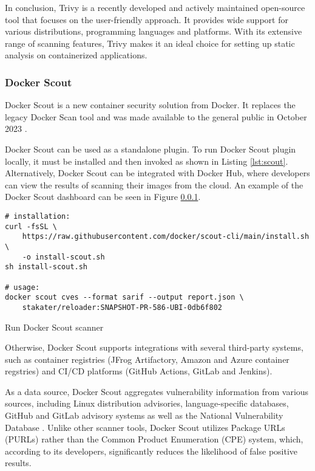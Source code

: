 In conclusion, Trivy is a recently developed and actively maintained open-source tool that focuses on the user-friendly approach. It provides wide support for various distributions, programming languages and platforms. With its extensive range of scanning features, Trivy makes it an ideal choice for setting up static analysis on containerized applications.


\subsubsection{Docker Scout}

Docker Scout is a new container security solution from Docker. It replaces the legacy Docker Scan tool and was made available to the general public in October 2023 \cite{s:scoutga}. 

Docker Scout can be used as a standalone plugin. To run Docker Scout plugin locally, it must be installed and then invoked as shown in Listing \ref{lst:scout}. Alternatively, Docker Scout can be integrated with Docker Hub, where developers can view the results of scanning their images from the cloud. An example of the Docker Scout dashboard can be seen in Figure \ref{}.


\begin{listing}[htp]
    \centering
    \begin{minipage}{1\linewidth}
        \begin{verbatim}
# installation:
curl -fsSL \
    https://raw.githubusercontent.com/docker/scout-cli/main/install.sh \
    -o install-scout.sh
sh install-scout.sh

# usage:
docker scout cves --format sarif --output report.json \
    stakater/reloader:SNAPSHOT-PR-586-UBI-0db6f802
        \end{verbatim}
    \end{minipage}
    \caption{Run Docker Scout scanner}
    \label{lst:scout}
\end{listing}

Otherwise, Docker Scout supports integrations with several third-party systems, such as container registries (JFrog Artifactory, Amazon and Azure container regstries) and CI/CD platforms (GitHub Actions, GitLab and Jenkins).

As a data source, Docker Scout aggregates vulnerability information from various sources, including Linux distribution advisories, language-specific databases, GitHub and GitLab advisory systems as well as the National Vulnerability Database \cite{d:scoutdb}. Unlike other scanner tools, Docker Scout utilizes Package URLs (PURLs) rather than the Common Product Enumeration (CPE) system, which, according to its developers, significantly reduces the likelihood of false positive results.

